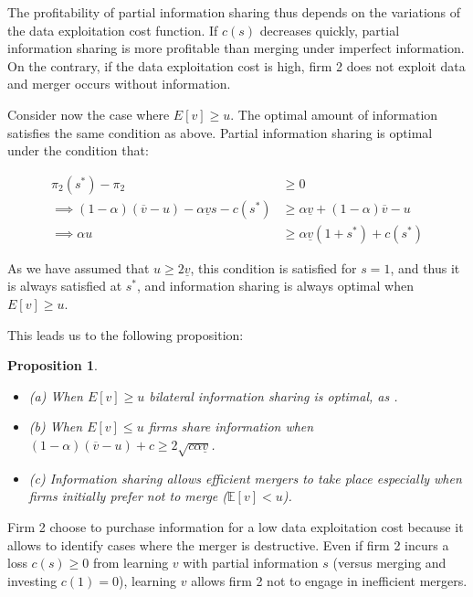 \documentclass[a4paper,leqno]{article}%
\newtheorem{prop}{Proposition}
\newcommand{\E}{\mathbb E}
\renewcommand{\a}{\alpha}
\newcommand{\uv}{\underline{v}}
\newcommand{\ov}{\overline{v}}
\begin{document}
\medskip

The profitability of partial information sharing thus depends on the variations of the data exploitation cost function. If $c(s)$ decreases quickly, partial information sharing is more profitable than merging under imperfect information. On the contrary, if the data exploitation cost is high, firm 2 does not exploit data and merger occurs without information. 

\medskip

Consider now the case where $E[v]\geq u$. The optimal amount of information satisfies the same condition as above. Partial information sharing is optimal under the condition that:

\begin{equation}
    \begin{aligned}
      \pi_2(s^*)-\pi_2&\geq0\\
      \implies (1-\a)(\ov -u)-\a \uv s-c(s^*)&\geq \a\uv+(1-\a)\ov-u\\
      \implies \a u&\geq \a\uv(1+s^*)+c(s^*)
    \end{aligned}
\end{equation}

As we have assumed that $u\geq 2 \uv$, this condition is satisfied for $s=1$, and thus it is always satisfied at $s^*$, and information sharing is always optimal when $E[v]\geq u$.


%

This leads us to the following proposition:

\begin{prop}~~\label{prop:1}

\begin{itemize}
    \item (a) When $E[v]\geq u$ bilateral information sharing is optimal, as .
    \item (b) When $E[v]\leq u$ firms share information when $(1-\a)(\ov -u)+c\geq 2 \sqrt{c\a \uv}$.
    \item (c) Information sharing allows efficient mergers to take place especially  when firms initially prefer not to merge ($\E[v]<u$). 
\end{itemize} 

\end{prop}

\medskip

Firm 2 choose to purchase information for a low data exploitation cost because it allows to identify cases where the merger is destructive. Even if firm 2 incurs a loss $c(s)\geq 0$ from learning $v$ with partial information $s$ (versus merging and investing $c(1)=0$), learning $v$ allows firm 2 not to engage in inefficient mergers. 
\end{document}
